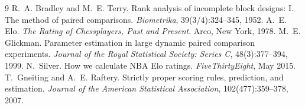 \documentclass[11pt]{article}
\theoremstyle{plain}
\theoremstyle{definition}
\theoremstyle{remark}
\begin{document}
\begin{thebibliography}{9}
 R.~A. Bradley and M.~E. Terry. Rank analysis of incomplete block designs: I. The method of paired comparisons. \emph{Biometrika}, 39(3/4):324--345, 1952.
 A.~E. Elo. \emph{The Rating of Chessplayers, Past and Present}. Arco, New York, 1978.
 M.~E. Glickman. Parameter estimation in large dynamic paired comparison experiments. \emph{Journal of the Royal Statistical Society: Series C}, 48(3):377--394, 1999.
 N.~Silver. How we calculate NBA Elo ratings. \emph{FiveThirtyEight}, May 2015.
 T.~Gneiting and A.~E. Raftery. Strictly proper scoring rules, prediction, and estimation. \emph{Journal of the American Statistical Association}, 102(477):359--378, 2007.
\end{thebibliography}
\end{document}

